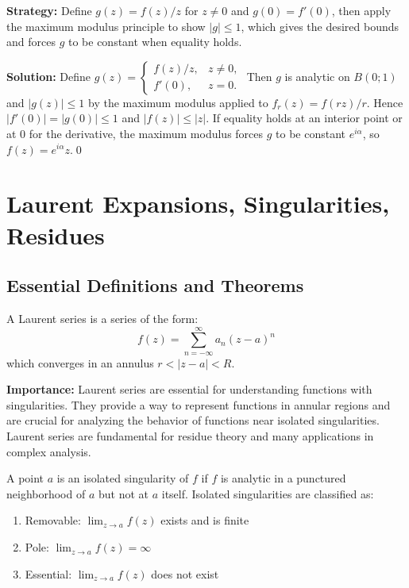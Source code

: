 \noindent\textbf{Strategy:} Define \( g(z) = f(z)/z \) for \( z \neq 0 \) and \( g(0) = f'(0) \), then apply the maximum modulus principle to show \( |g| \leq 1 \), which gives the desired bounds and forces \( g \) to be constant when equality holds.

\bigskip\noindent\textbf{Solution:}
Define $g(z)=\begin{cases} f(z)/z,& z\ne0,\\ f'(0),& z=0.\end{cases}$ Then $g$ is analytic on $B(0;1)$ and $|g(z)|\le1$ by the maximum modulus applied to $f_r(z)=f(rz)/r$. Hence $|f'(0)|=|g(0)|\le1$ and $|f(z)|\le |z|$. If equality holds at an interior point or at $0$ for the derivative, the maximum modulus forces $g$ to be constant $e^{i\alpha}$, so $f(z)=e^{i\alpha}z$.\qed
\section{Laurent Expansions, Singularities, Residues}

\subsection*{Essential Definitions and Theorems}

\begin{definition}
A Laurent series is a series of the form:
\[f(z) = \sum_{n=-\infty}^{\infty} a_n(z-a)^n\]
which converges in an annulus $r < |z-a| < R$.
\end{definition}

\noindent\textbf{Importance:} Laurent series are essential for understanding functions with singularities. They provide a way to represent functions in annular regions and are crucial for analyzing the behavior of functions near isolated singularities. Laurent series are fundamental for residue theory and many applications in complex analysis.



\begin{definition}
A point $a$ is an isolated singularity of $f$ if $f$ is analytic in a punctured neighborhood of $a$ but not at $a$ itself. Isolated singularities are classified as:
\begin{enumerate}[label=(\alph*)]
\item Removable: $\lim_{z \to a} f(z)$ exists and is finite
\item Pole: $\lim_{z \to a} f(z) = \infty$
\item Essential: $\lim_{z \to a} f(z)$ does not exist
\end{enumerate}
\end{definition}

